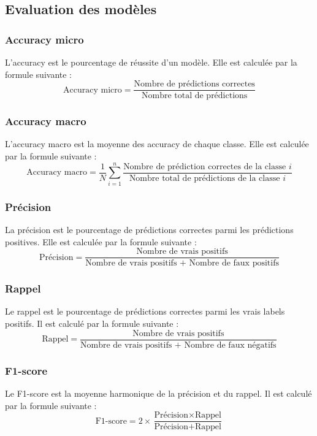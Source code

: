 \subsection{Evaluation des modèles}
\label{sec: metrics}
\subsubsection{Accuracy micro}
L'accuracy est le pourcentage de réussite d'un modèle. Elle est calculée par la formule suivante :
\begin{equation}
    \text{Accuracy micro} = \frac{\text{Nombre de prédictions correctes}}{\text{Nombre total de prédictions}}
\end{equation}

\subsubsection{Accuracy macro}
L'accuracy macro est la moyenne des accuracy de chaque classe. Elle est calculée par la formule suivante :
\begin{equation}
    \text{Accuracy macro} = \frac{1}{N} \sum_{i=1}^{n} \frac{\text{Nombre de prédiction correctes de la classe } i}{\text{Nombre total de prédictions de la classe } i}{}
\end{equation}

\subsubsection{Précision}
La précision est le pourcentage de prédictions correctes parmi les prédictions positives. Elle est calculée par la formule suivante :
\begin{equation}
    \text{Précision} = \frac{\text{Nombre de vrais positifs}}{\text{Nombre de vrais positifs + Nombre de faux positifs}}
\end{equation}

\subsubsection{Rappel}
Le rappel est le pourcentage de prédictions correctes parmi les vrais labels positifs. Il est calculé par la formule suivante :
\begin{equation}
    \text{Rappel} = \frac{\text{Nombre de vrais positifs}}{\text{Nombre de vrais positifs + Nombre de faux négatifs}} 
\end{equation}

\subsubsection{F1-score}
Le F1-score est la moyenne harmonique de la précision et du rappel. Il est calculé par la formule suivante :
\begin{equation}
    \text{F1-score} = 2 \times \frac{\text{Précision} \times \text{Rappel}}{\text{Précision} + \text{Rappel}}
\end{equation}

